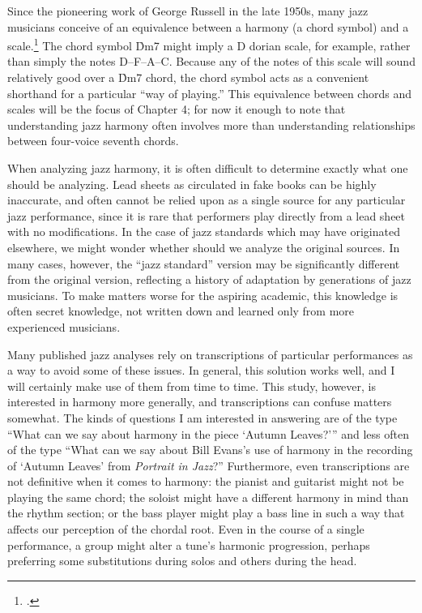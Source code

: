 \documentclass[diss]{subfiles}
\begin{document}
Since the pioneering work of George Russell in the late 1950s, many jazz
musicians conceive of an equivalence between a harmony (a chord symbol) and a
scale.\footcite{russell:lcc} The chord symbol \h{Dm7} might imply a D dorian
scale, for example, rather than simply the notes D--F--A--C. Because any of
the notes of this scale will sound relatively good over a \h{Dm7} chord, the
chord symbol acts as a convenient shorthand for a particular “way of playing.”
This equivalence between chords and scales will be the focus of Chapter 4; for
now it enough to note that understanding jazz harmony often involves more than
understanding relationships between four-voice seventh chords.

When analyzing jazz harmony, it is often difficult to determine exactly what
one should be analyzing. Lead sheets as circulated in fake books can be highly
inaccurate, and often cannot be relied upon as a single source for any
particular jazz performance, since it is rare that performers play directly
from a lead sheet with no modifications. In the case of jazz
standards which may have originated elsewhere, we might wonder whether should
we analyze the original sources. In many cases, however, the “jazz standard”
version may be significantly different from the original version, reflecting a
history of adaptation by generations of jazz musicians. To make
matters worse for the aspiring academic, this knowledge is often secret
knowledge, not written down and learned only from more experienced musicians.

Many published jazz analyses rely on transcriptions of particular performances
as a way to avoid some of these issues. In general, this solution works well,
and I will certainly make use of them from time to time. This study, however,
is interested in harmony more generally, and transcriptions can confuse
matters somewhat. The kinds of questions I am interested in answering are of
the type “What can we say about harmony in the piece ‘Autumn Leaves?’” and
less often of the type “What can we say about Bill Evans’s use of harmony in
the recording of ‘Autumn Leaves’ from \emph{Portrait in Jazz}?” Furthermore,
even transcriptions are not definitive when it comes to harmony: the pianist
and guitarist might not be playing the same chord; the soloist might have a
different harmony in mind than the rhythm section; or the bass player might
play a bass line in such a way that affects our perception of the chordal
root. Even in the course of a single performance, a group might alter a tune’s
harmonic progression, perhaps preferring some substitutions during solos and
others during the head.
\end{document}
